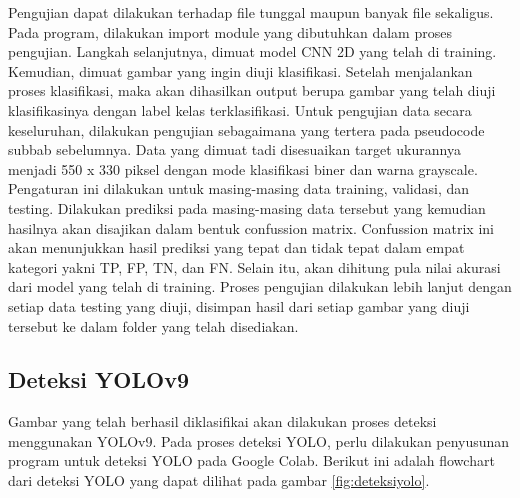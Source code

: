 Pengujian dapat dilakukan terhadap file tunggal maupun banyak file sekaligus. Pada program, dilakukan import module yang dibutuhkan dalam proses pengujian. Langkah selanjutnya, dimuat model CNN 2D yang telah di training. Kemudian, dimuat gambar yang ingin diuji klasifikasi. Setelah menjalankan proses klasifikasi, maka akan dihasilkan output berupa gambar yang telah diuji klasifikasinya dengan label kelas terklasifikasi. Untuk pengujian data secara keseluruhan, dilakukan pengujian sebagaimana yang tertera pada pseudocode subbab sebelumnya. Data yang dimuat tadi disesuaikan target ukurannya menjadi 550 x 330 piksel dengan mode klasifikasi biner dan warna grayscale. Pengaturan ini dilakukan untuk masing-masing data training, validasi, dan testing. Dilakukan prediksi pada masing-masing data tersebut yang kemudian hasilnya akan disajikan dalam bentuk confussion matrix. Confussion matrix ini akan menunjukkan hasil prediksi yang tepat dan tidak tepat dalam empat kategori yakni TP, FP, TN, dan FN. Selain itu, akan dihitung pula nilai akurasi dari model yang telah di training. Proses pengujian dilakukan lebih lanjut dengan setiap data testing yang diuji, disimpan hasil dari setiap gambar yang diuji tersebut ke dalam folder yang telah disediakan.

\subsection{Deteksi YOLOv9}
Gambar yang telah berhasil diklasifikai akan dilakukan proses deteksi menggunakan YOLOv9. Pada proses deteksi YOLO, perlu dilakukan penyusunan program untuk deteksi YOLO pada Google Colab. Berikut ini adalah flowchart dari deteksi YOLO yang dapat dilihat pada gambar \ref{fig:deteksiyolo}.

